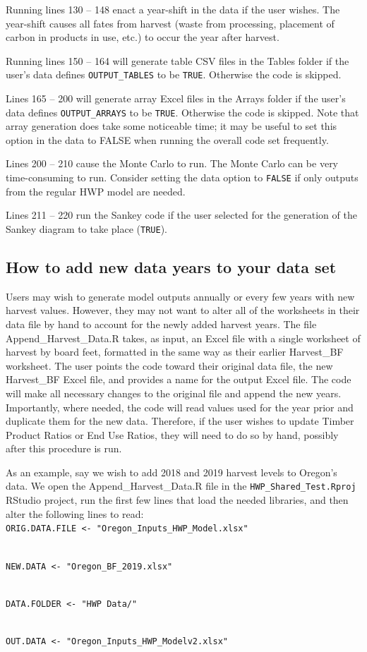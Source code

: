 \documentclass[
]{book}
\begin{document}
Running lines 130 -- 148 enact a year-shift in the data if the user wishes. The year-shift causes all fates from harvest (waste from processing, placement of carbon in products in use, etc.) to occur the year after harvest.

Running lines 150 -- 164 will generate table CSV files in the Tables folder if the user's data defines \texttt{OUTPUT\_TABLES} to be \texttt{TRUE}. Otherwise the code is skipped.

Lines 165 -- 200 will generate array Excel files in the Arrays folder if the user's data defines \texttt{OUTPUT\_ARRAYS} to be \texttt{TRUE}. Otherwise the code is skipped. Note that array generation does take some noticeable time; it may be useful to set this option in the data to FALSE when running the overall code set frequently.

Lines 200 -- 210 cause the Monte Carlo to run. The Monte Carlo can be very time-consuming to run. Consider setting the data option to \texttt{FALSE} if only outputs from the regular HWP model are needed.

Lines 211 -- 220 run the Sankey code if the user selected for the generation of the Sankey diagram to take place (\texttt{TRUE}).

\hypertarget{run-opp-add}{%
\subsection{How to add new data years to your data set}\label{run-opp-add}}

Users may wish to generate model outputs annually or every few years with new harvest values. However, they may not want to alter all of the worksheets in their data file by hand to account for the newly added harvest years. The file Append\_Harvest\_Data.R takes, as input, an Excel file with a single worksheet of harvest by board feet, formatted in the same way as their earlier Harvest\_BF worksheet. The user points the code toward their original data file, the new Harvest\_BF Excel file, and provides a name for the output Excel file. The code will make all necessary changes to the original file and append the new years. Importantly, where needed, the code will read values used for the year prior and duplicate them for the new data. Therefore, if the user wishes to update Timber Product Ratios or End Use Ratios, they will need to do so by hand, possibly after this procedure is run.

As an example, say we wish to add 2018 and 2019 harvest levels to Oregon's data. We open the Append\_Harvest\_Data.R file in the \texttt{HWP\_Shared\_Test.Rproj} RStudio project, run the first few lines that load the needed libraries, and then alter the following lines to read:\\
\texttt{ORIG.DATA.FILE\ \textless{}-\ "Oregon\_Inputs\_HWP\_Model.xlsx"}\strut \\
\texttt{NEW.DATA\ \textless{}-\ "Oregon\_BF\_2019.xlsx"}\strut \\
\texttt{DATA.FOLDER\ \textless{}-\ "HWP\ Data/"}\strut \\
\texttt{OUT.DATA\ \textless{}-\ "Oregon\_Inputs\_HWP\_Modelv2.xlsx"}
\end{document}
